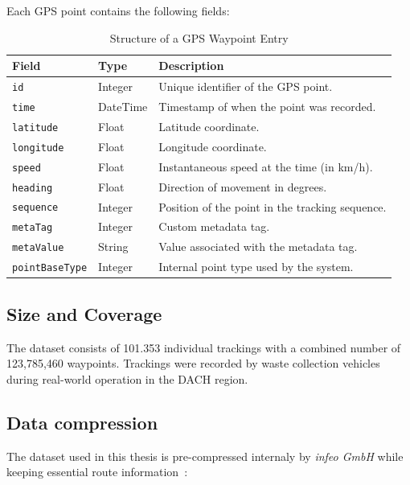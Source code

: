 \documentclass[a4paper,12pt,twoside]{scrreprt}
\begin{document}
Each GPS point contains the following fields:
\begin{table}[H]
  \centering
  \caption{Structure of a GPS Waypoint Entry}
  \label{tab:gps_point_structure}
  \begin{tabular}{|l|l|p{8cm}|}
    \hline
    \textbf{Field}         & \textbf{Type} & \textbf{Description}
    \\
    \hline
    \texttt{id}            & Integer       & Unique identifier of the GPS
    point.
    \\
    \hline
    \texttt{time}          & DateTime      & Timestamp of when the point was
    recorded.
    \\
    \hline
    \texttt{latitude}      & Float         & Latitude coordinate.
    \\
    \hline
    \texttt{longitude}     & Float         & Longitude coordinate.
    \\
    \hline
    \texttt{speed}         & Float         & Instantaneous speed at the time
    (in km/h).
    \\
    \hline
    \texttt{heading}       & Float         & Direction of movement in degrees.
    \\
    \hline
    \texttt{sequence}      & Integer       & Position of the point in the
    tracking
    sequence.
    \\
    \hline
    \texttt{metaTag}       & Integer       & Custom metadata tag.
    \\
    \hline
    \texttt{metaValue}     & String        & Value associated with the metadata
    tag.
    \\
    \hline
    \texttt{pointBaseType} & Integer       & Internal point type used by the
    system.
    \\
    \hline
  \end{tabular}
\end{table}

\clearpage
\subsection{Size and Coverage}

The dataset consists of 101.353 individual trackings with a combined number of
123,785,460 waypoints.
Trackings were recorded by waste collection vehicles during real-world
operation in the DACH
region.

\subsection{Data compression}
The dataset used in this thesis is pre-compressed internaly by \textit{infeo
  GmbH} while keeping essential route information~\cite{noauthor_route_nodate}:
\end{document}
